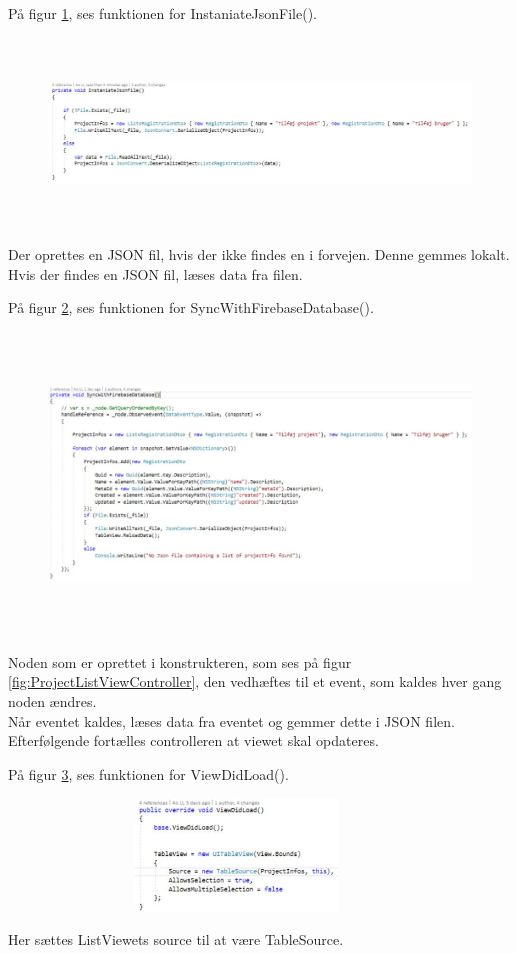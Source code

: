 På figur \ref{fig:JSONFile}, ses funktionen for InstaniateJsonFile().
\begin{figure}[H] %
	\centering
	\includegraphics[height=5cm, width=15cm]{../ArkitekturDesign/Design/ProjectList/JSONFile}
	\caption{}
	\label{fig:JSONFile}
\end{figure}
Der oprettes en JSON fil, hvis der ikke findes en i forvejen. Denne gemmes lokalt.\\
Hvis der findes en JSON fil, læses data fra filen.

\clearpage

På figur \ref{fig:SyncWithDB}, ses funktionen for SyncWithFirebaseDatabase().
\begin{figure}[H] %
	\centering
	\includegraphics[height=8cm, width=15cm]{../ArkitekturDesign/Design/ProjectList/SyncWithDB}
	\caption{}
	\label{fig:SyncWithDB}
\end{figure}
Noden som er oprettet i konstrukteren, som ses på figur \ref{fig:ProjectListViewController}, den vedhæftes til et event, som kaldes hver gang noden ændres. \\
Når eventet kaldes, læses data fra eventet og gemmer dette i JSON filen. Efterfølgende fortælles controlleren at viewet skal opdateres.

På figur \ref{fig:ViewDidLoad}, ses funktionen for ViewDidLoad().
\begin{figure}[H] %
	\centering
	\includegraphics[height=3cm, width=10cm]{../ArkitekturDesign/Design/ProjectList/ViewDidLoad}
	\caption{}
	\label{fig:ViewDidLoad}
\end{figure}
Her sættes ListViewets source til at være TableSource.

